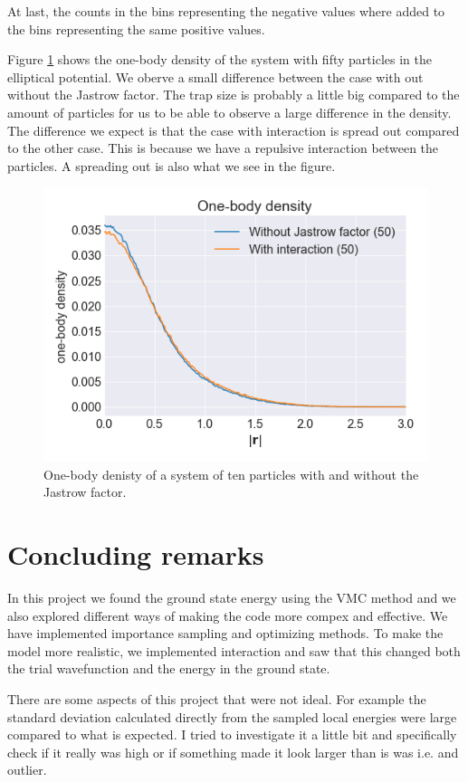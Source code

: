 At last, the counts in the bins representing the negative values where added to the bins representing the same positive values.

Figure \ref{fig:one_body_density_N_50} shows the one-body density of the system with fifty particles in the elliptical potential. We oberve a small difference between the case with out without the Jastrow factor. The trap size is probably a little  big compared to the amount of particles for us to be able to observe a large difference in the density. The difference we expect is that the case with interaction is spread out compared to the other case. This is because we have a repulsive interaction between the particles. A spreading out is also what we see in the figure.

\begin{figure}
\center
\includegraphics[width=0.7\linewidth]{../Results/one_body_density_10p}\caption{One-body denisty of a system of ten particles with and without the Jastrow factor.}\label{fig:one_body_density_N_50}
\end{figure}

\section{Concluding remarks}

In this project we found the ground state energy using the VMC method and we also explored different ways of making the code more compex and effective. We have implemented importance sampling and optimizing methods. To make the model more realistic, we implemented interaction and saw that this changed both the trial wavefunction and the energy in the ground state. 

There are some aspects of this project that were not ideal. For example the standard deviation calculated directly from the sampled local energies were large compared to what is expected. I tried to investigate it a little bit and specifically check if it really was high or if something made it look larger than is was i.e. and outlier. 

